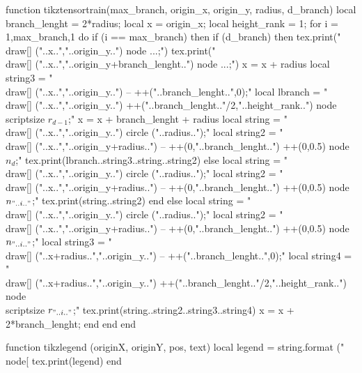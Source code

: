 \begin{luacode*}
  
    function tikztensortrain(max_branch, origin_x, origin_y, radius, d_branch)
      local branch_lenght = 2*radius;
      local x = origin_x;
      local height_rank = 1;
      for i = 1,max_branch,1 do
        if (i == max_branch) then
          if (d_branch) then
            tex.print("\\draw[] ("..x..","..origin_y..") node {...};")
            tex.print("\\draw[] ("..x..","..origin_y+branch_lenght..") node {...};")
            x = x + radius
            local string3 = "\\draw[] ("..x..","..origin_y..") -- ++("..branch_lenght..",0);"
            local lbranch = "\\draw[] ("..x..","..origin_y..") ++("..branch_lenght.."/2,"..height_rank..") node {\\scriptsize $r_{d-1}$};"
            x = x + branch_lenght + radius
            local string = "\\draw[] ("..x..","..origin_y..") circle ("..radius..");"
            local string2 = "\\draw[] ("..x..","..origin_y+radius..") -- ++(0,"..branch_lenght..") ++(0,0.5) node {$n_{d}$};"
            tex.print(lbranch..string3..string..string2)
          else
            local string = "\\draw[] ("..x..","..origin_y..") circle ("..radius..");"
            local string2 = "\\draw[] ("..x..","..origin_y+radius..") -- ++(0,"..branch_lenght..") ++(0,0.5) node {$n_{"..i.."}$};"
            tex.print(string..string2)
          end
        else
          local string = "\\draw[] ("..x..","..origin_y..") circle ("..radius..");"
          local string2 = "\\draw[] ("..x..","..origin_y+radius..") -- ++(0,"..branch_lenght..") ++(0,0.5) node {$n_{"..i.."}$};"
          local string3 = "\\draw[] ("..x+radius..","..origin_y..") -- ++("..branch_lenght..",0);"
          local string4 = "\\draw[] ("..x+radius..","..origin_y..") ++("..branch_lenght.."/2,"..height_rank..") node {\\scriptsize $r_{"..i.."}$};"
          tex.print(string..string2..string3..string4)
          x = x + 2*branch_lenght;
        end
      end
    end

  function tikzlegend (originX, originY, pos, text)
  local legend = string.format ("\\node[%
  tex.print(legend)
  end


\end{luacode*}
